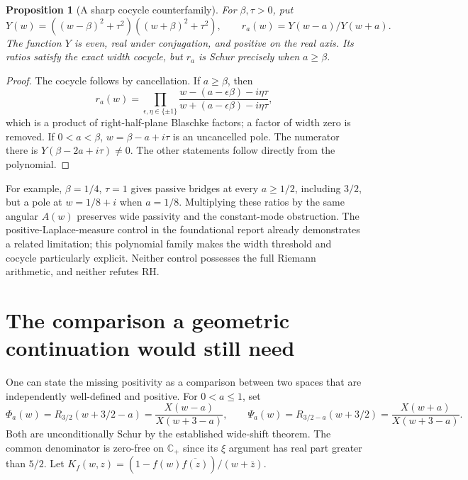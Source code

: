 \documentclass[11pt,letterpaper]{article}
\newtheorem{proposition}[theorem]{Proposition}
\newcommand{\CP}{\mathbb C_+}
\begin{document}
\begin{proposition}[A sharp cocycle counterfamily]
For $\beta,\tau>0$, put
\[
 Y(w)=((w-\beta)^2+\tau^2)((w+\beta)^2+\tau^2),\qquad
 r_a(w)=Y(w-a)/Y(w+a).
\]
The function $Y$ is even, real under conjugation, and positive on the real axis. Its ratios satisfy the exact width cocycle, but $r_a$ is Schur precisely when $a\geq\beta$.
\end{proposition}
\begin{proof}
The cocycle follows by cancellation. If $a\geq\beta$, then
\[
 r_a(w)=\prod_{\epsilon,\eta\in\{\pm1\}}
 \frac{w-(a-\epsilon\beta)-i\eta\tau}
      {w+(a-\epsilon\beta)-i\eta\tau},
\]
which is a product of right-half-plane Blaschke factors; a factor of width zero is removed. If $0<a<\beta$, $w=\beta-a+i\tau$ is an uncancelled pole. The numerator there is $Y(\beta-2a+i\tau)\ne0$. The other statements follow directly from the polynomial.
\end{proof}
For example, $\beta=1/4$, $\tau=1$ gives passive bridges at every $a\geq1/2$, including $3/2$, but a pole at $w=1/8+i$ when $a=1/8$. Multiplying these ratios by the same angular $A(w)$ preserves wide passivity and the constant-mode obstruction. The positive-Laplace-measure control in the foundational report already demonstrates a related limitation; this polynomial family makes the width threshold and cocycle particularly explicit. Neither control possesses the full Riemann arithmetic, and neither refutes RH.

\section{The comparison a geometric continuation would still need}
One can state the missing positivity as a comparison between two spaces that are independently well-defined and positive. For $0<a\leq1$, set
\[
 \Phi_a(w)=R_{3/2}(w+3/2-a)=\frac{X(w-a)}{X(w+3-a)},\qquad
 \Psi_a(w)=R_{3/2-a}(w+3/2)=\frac{X(w+a)}{X(w+3-a)}.
\]
Both are unconditionally Schur by the established wide-shift theorem. The common denominator is zero-free on $\CP$ since its $\xi$ argument has real part greater than $5/2$. Let
$K_f(w,z)=(1-f(w)\overline{f(z)})/(w+\bar z)$.
\end{document}
